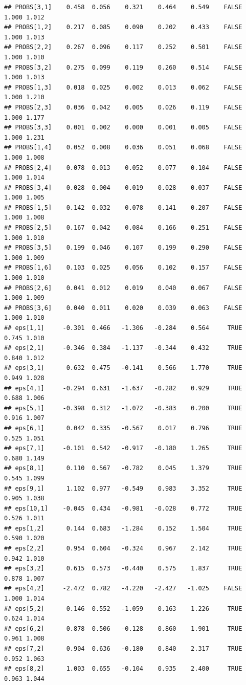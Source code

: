 \documentclass[]{article}
\begin{document}
\begin{verbatim}
## PROBS[3,1]    0.458  0.056    0.321    0.464    0.549    FALSE 1.000 1.012
## PROBS[1,2]    0.217  0.085    0.090    0.202    0.433    FALSE 1.000 1.013
## PROBS[2,2]    0.267  0.096    0.117    0.252    0.501    FALSE 1.000 1.010
## PROBS[3,2]    0.275  0.099    0.119    0.260    0.514    FALSE 1.000 1.013
## PROBS[1,3]    0.018  0.025    0.002    0.013    0.062    FALSE 1.000 1.210
## PROBS[2,3]    0.036  0.042    0.005    0.026    0.119    FALSE 1.000 1.177
## PROBS[3,3]    0.001  0.002    0.000    0.001    0.005    FALSE 1.000 1.231
## PROBS[1,4]    0.052  0.008    0.036    0.051    0.068    FALSE 1.000 1.008
## PROBS[2,4]    0.078  0.013    0.052    0.077    0.104    FALSE 1.000 1.014
## PROBS[3,4]    0.028  0.004    0.019    0.028    0.037    FALSE 1.000 1.005
## PROBS[1,5]    0.142  0.032    0.078    0.141    0.207    FALSE 1.000 1.008
## PROBS[2,5]    0.167  0.042    0.084    0.166    0.251    FALSE 1.000 1.010
## PROBS[3,5]    0.199  0.046    0.107    0.199    0.290    FALSE 1.000 1.009
## PROBS[1,6]    0.103  0.025    0.056    0.102    0.157    FALSE 1.000 1.010
## PROBS[2,6]    0.041  0.012    0.019    0.040    0.067    FALSE 1.000 1.009
## PROBS[3,6]    0.040  0.011    0.020    0.039    0.063    FALSE 1.000 1.010
## eps[1,1]     -0.301  0.466   -1.306   -0.284    0.564     TRUE 0.745 1.010
## eps[2,1]     -0.346  0.384   -1.137   -0.344    0.432     TRUE 0.840 1.012
## eps[3,1]      0.632  0.475   -0.141    0.566    1.770     TRUE 0.949 1.028
## eps[4,1]     -0.294  0.631   -1.637   -0.282    0.929     TRUE 0.688 1.006
## eps[5,1]     -0.398  0.312   -1.072   -0.383    0.200     TRUE 0.916 1.007
## eps[6,1]      0.042  0.335   -0.567    0.017    0.796     TRUE 0.525 1.051
## eps[7,1]     -0.101  0.542   -0.917   -0.180    1.265     TRUE 0.680 1.149
## eps[8,1]      0.110  0.567   -0.782    0.045    1.379     TRUE 0.545 1.099
## eps[9,1]      1.102  0.977   -0.549    0.983    3.352     TRUE 0.905 1.038
## eps[10,1]    -0.045  0.434   -0.981   -0.028    0.772     TRUE 0.526 1.011
## eps[1,2]      0.144  0.683   -1.284    0.152    1.504     TRUE 0.590 1.020
## eps[2,2]      0.954  0.604   -0.324    0.967    2.142     TRUE 0.942 1.010
## eps[3,2]      0.615  0.573   -0.440    0.575    1.837     TRUE 0.878 1.007
## eps[4,2]     -2.472  0.782   -4.220   -2.427   -1.025    FALSE 1.000 1.014
## eps[5,2]      0.146  0.552   -1.059    0.163    1.226     TRUE 0.624 1.014
## eps[6,2]      0.878  0.506   -0.128    0.860    1.901     TRUE 0.961 1.008
## eps[7,2]      0.904  0.636   -0.180    0.840    2.317     TRUE 0.952 1.063
## eps[8,2]      1.003  0.655   -0.104    0.935    2.400     TRUE 0.963 1.044

\end{verbatim}
\end{document}
